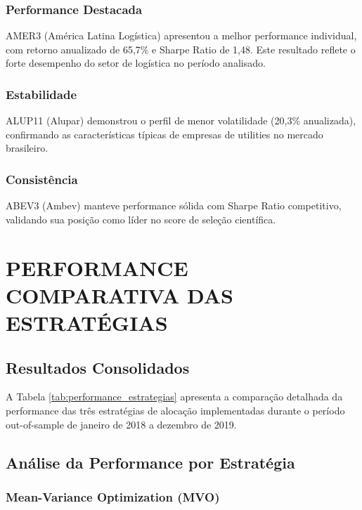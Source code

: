 \subsubsection{Performance Destacada}
AMER3 (América Latina Logística) apresentou a melhor performance individual, com retorno anualizado de 65,7\% e Sharpe Ratio de 1,48. Este resultado reflete o forte desempenho do setor de logística no período analisado.

\subsubsection{Estabilidade}
ALUP11 (Alupar) demonstrou o perfil de menor volatilidade (20,3\% anualizada), confirmando as características típicas de empresas de utilities no mercado brasileiro.

\subsubsection{Consistência}
ABEV3 (Ambev) manteve performance sólida com Sharpe Ratio competitivo, validando sua posição como líder no score de seleção científica.

\section{PERFORMANCE COMPARATIVA DAS ESTRATÉGIAS}

\subsection{Resultados Consolidados}

A Tabela \ref{tab:performance_estrategias} apresenta a comparação detalhada da performance das três estratégias de alocação implementadas durante o período out-of-sample de janeiro de 2018 a dezembro de 2019.

% 

\subsection{Análise da Performance por Estratégia}

\subsubsection{Mean-Variance Optimization (MVO)}

